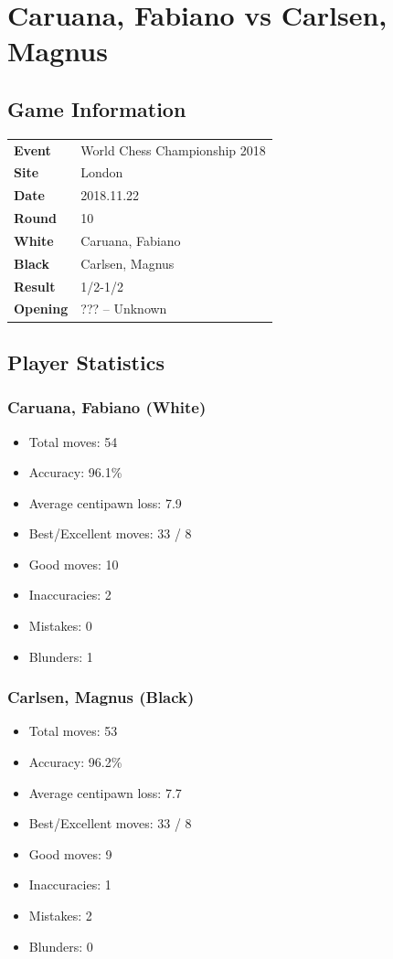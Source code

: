 \documentclass[11pt]{book}
\begin{document}
\chapter{Caruana, Fabiano vs Carlsen, Magnus}

\section{Game Information}
\begin{tabular}{ll}
\textbf{Event} & World Chess Championship 2018 \\
\textbf{Site} & London \\
\textbf{Date} & 2018.11.22 \\
\textbf{Round} & 10 \\
\textbf{White} & Caruana, Fabiano \\
\textbf{Black} & Carlsen, Magnus \\
\textbf{Result} & 1/2-1/2 \\
\textbf{Opening} & ??? -- Unknown \\
\end{tabular}

\section{Player Statistics}

\subsection{Caruana, Fabiano (White)}
\begin{itemize}
\item Total moves: 54
\item Accuracy: 96.1\%
\item Average centipawn loss: 7.9
\item Best/Excellent moves: 33 / 8
\item Good moves: 10
\item Inaccuracies: 2
\item Mistakes: 0
\item Blunders: 1
\end{itemize}

\subsection{Carlsen, Magnus (Black)}
\begin{itemize}
\item Total moves: 53
\item Accuracy: 96.2\%
\item Average centipawn loss: 7.7
\item Best/Excellent moves: 33 / 8
\item Good moves: 9
\item Inaccuracies: 1
\item Mistakes: 2
\item Blunders: 0
\end{itemize}
\end{document}
